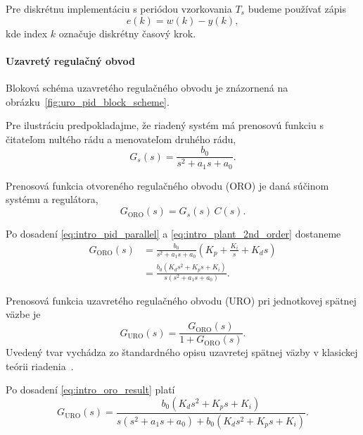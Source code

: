 Pre diskrétnu implementáciu s periódou vzorkovania $T_s$ budeme používať zápis
\begin{equation}
    e(k) = w(k) - y(k),
    \label{eq:intro_error_disc}
\end{equation}
kde index $k$ označuje diskrétny časový krok.



\paragraph{Uzavretý regulačný obvod}

Bloková schéma uzavretého regulačného obvodu je znázornená na obrázku~\ref{fig:uro_pid_block_scheme}.


Pre ilustráciu predpokladajme, že riadený systém má prenosovú funkciu s čitateľom nultého rádu a menovateľom druhého rádu,
\begin{equation}
    G_s(s) = \frac{b_0}{s^2 + a_1 s + a_0}.
    \label{eq:intro_plant_2nd_order}
\end{equation}

Prenosová funkcia otvoreného regulačného obvodu (ORO) je daná súčinom systému a regulátora,
\begin{equation}
    G_{\mathrm{ORO}}(s) = G_s(s)\,C(s).
    \label{eq:intro_oro_def}
\end{equation}

Po dosadení \eqref{eq:intro_pid_parallel} a \eqref{eq:intro_plant_2nd_order} dostaneme
\begin{align}
    G_{\mathrm{ORO}}(s)
    &= \frac{b_0}{s^2 + a_1 s + a_0}
       \left(K_p + \frac{K_i}{s} + K_d s\right) \nonumber \\
    &= \frac{b_0\left(K_d s^2 + K_p s + K_i\right)}{s\left(s^2 + a_1 s + a_0\right)}.
    \label{eq:intro_oro_result}
\end{align}

Prenosová funkcia uzavretého regulačného obvodu (URO) pri jednotkovej spätnej väzbe je
\begin{equation}
    G_{\mathrm{URO}}(s) = \frac{G_{\mathrm{ORO}}(s)}{1 + G_{\mathrm{ORO}}(s)}.
    \label{eq:intro_uro_def}
\end{equation}
Uvedený tvar vychádza zo štandardného opisu uzavretej spätnej väzby
v klasickej teórii riadenia~\cite{nise2015}.

Po dosadení \eqref{eq:intro_oro_result} platí
\begin{equation}
    G_{\mathrm{URO}}(s)
    =
    \frac{b_0\left(K_d s^2 + K_p s + K_i\right)}
    {s\left(s^2 + a_1 s + a_0\right) + b_0\left(K_d s^2 + K_p s + K_i\right)}.
    \label{eq:intro_uro_result}
\end{equation}

